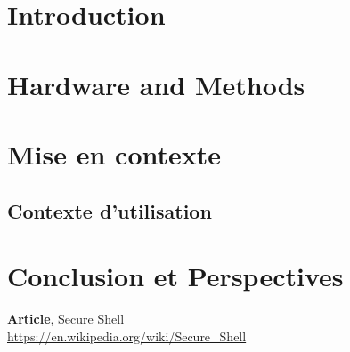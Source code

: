 \documentclass[11pt]{report}
\begin{document}




	\listoffigures

    \listoftables

\chapter{Introduction}
    

\chapter{Hardware and Methods}
    


\chapter{Mise en contexte}

    \section{Contexte d'utilisation}

\chapter*{Conclusion et Perspectives}


\begin{thebibliography}{9}%
     \textbf{Article}, Secure Shell\\
    \url{https://en.wikipedia.org/wiki/Secure_Shell}
\end{thebibliography} 
\end{document}
